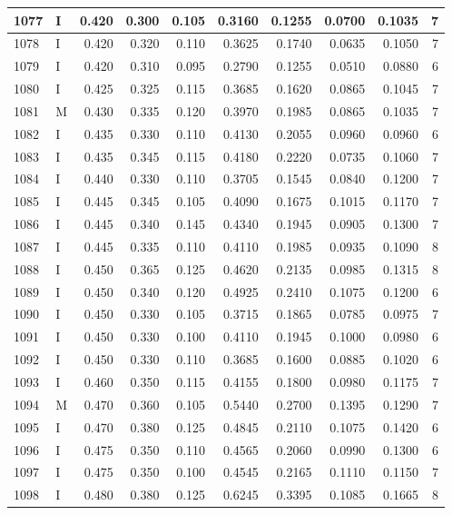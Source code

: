 \documentclass[9pt,twocolumn,twoside,]{pnas-new}
\begin{document}
\begin{tabular}{l|l|r|r|r|r|r|r|r|r}
\hline
1077 & I & 0.420 & 0.300 & 0.105 & 0.3160 & 0.1255 & 0.0700 & 0.1035 & 7\\
\hline
1078 & I & 0.420 & 0.320 & 0.110 & 0.3625 & 0.1740 & 0.0635 & 0.1050 & 7\\
\hline
1079 & I & 0.420 & 0.310 & 0.095 & 0.2790 & 0.1255 & 0.0510 & 0.0880 & 6\\
\hline
1080 & I & 0.425 & 0.325 & 0.115 & 0.3685 & 0.1620 & 0.0865 & 0.1045 & 7\\
\hline
1081 & M & 0.430 & 0.335 & 0.120 & 0.3970 & 0.1985 & 0.0865 & 0.1035 & 7\\
\hline
1082 & I & 0.435 & 0.330 & 0.110 & 0.4130 & 0.2055 & 0.0960 & 0.0960 & 6\\
\hline
1083 & I & 0.435 & 0.345 & 0.115 & 0.4180 & 0.2220 & 0.0735 & 0.1060 & 7\\
\hline
1084 & I & 0.440 & 0.330 & 0.110 & 0.3705 & 0.1545 & 0.0840 & 0.1200 & 7\\
\hline
1085 & I & 0.445 & 0.345 & 0.105 & 0.4090 & 0.1675 & 0.1015 & 0.1170 & 7\\
\hline
1086 & I & 0.445 & 0.340 & 0.145 & 0.4340 & 0.1945 & 0.0905 & 0.1300 & 7\\
\hline
1087 & I & 0.445 & 0.335 & 0.110 & 0.4110 & 0.1985 & 0.0935 & 0.1090 & 8\\
\hline
1088 & I & 0.450 & 0.365 & 0.125 & 0.4620 & 0.2135 & 0.0985 & 0.1315 & 8\\
\hline
1089 & I & 0.450 & 0.340 & 0.120 & 0.4925 & 0.2410 & 0.1075 & 0.1200 & 6\\
\hline
1090 & I & 0.450 & 0.330 & 0.105 & 0.3715 & 0.1865 & 0.0785 & 0.0975 & 7\\
\hline
1091 & I & 0.450 & 0.330 & 0.100 & 0.4110 & 0.1945 & 0.1000 & 0.0980 & 6\\
\hline
1092 & I & 0.450 & 0.330 & 0.110 & 0.3685 & 0.1600 & 0.0885 & 0.1020 & 6\\
\hline
1093 & I & 0.460 & 0.350 & 0.115 & 0.4155 & 0.1800 & 0.0980 & 0.1175 & 7\\
\hline
1094 & M & 0.470 & 0.360 & 0.105 & 0.5440 & 0.2700 & 0.1395 & 0.1290 & 7\\
\hline
1095 & I & 0.470 & 0.380 & 0.125 & 0.4845 & 0.2110 & 0.1075 & 0.1420 & 6\\
\hline
1096 & I & 0.475 & 0.350 & 0.110 & 0.4565 & 0.2060 & 0.0990 & 0.1300 & 6\\
\hline
1097 & I & 0.475 & 0.350 & 0.100 & 0.4545 & 0.2165 & 0.1110 & 0.1150 & 7\\
\hline
1098 & I & 0.480 & 0.380 & 0.125 & 0.6245 & 0.3395 & 0.1085 & 0.1665 & 8\\

\end{tabular}
\end{document}
